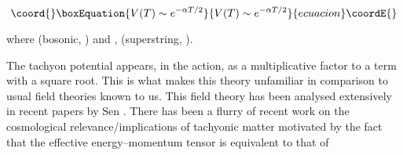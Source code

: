 \documentclass[a4paper,prd,aps,twocolumn]{revtex4}
\begin{document}
\begin{equation}\coord{}\boxEquation{
V(T) \sim e^{-\alpha T/2} 
}{
V(T) \sim e^{-\alpha T/2} 
}{ecuacion}\coordE{}\end{equation}

\noindent where \coordHE{} (bosonic, \coordHE{}) and ,\coordHE{}
(superstring, \coordHE{}).

The tachyon potential appears, in the action, as a multiplicative factor to 
a term with a square root. This
is what makes this theory unfamiliar in comparison to usual field theories
known to us.
This field theory has been analysed extensively in recent papers by
Sen {\cite{sen2}}. There has been a flurry of recent work on the cosmological
relevance/implications of tachyonic matter {\cite{gibbons}} motivated by the 
fact that
the effective energy--momentum tensor is equivalent to that of
\end{document}
